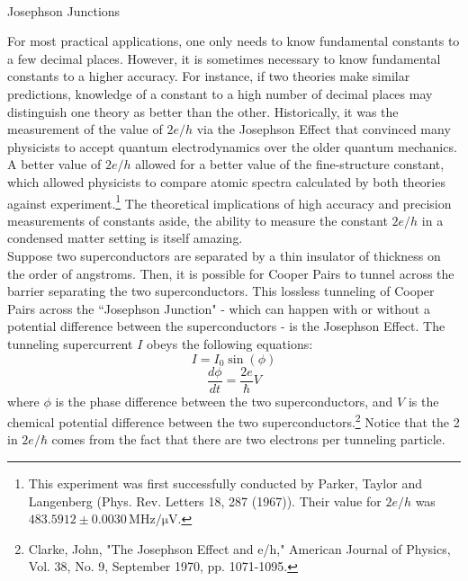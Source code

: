 \documentclass[a4paper,12pt]{article}
\newcommand{\unit}[1]{\ensuremath{\, \mathrm{#1}}}
\begin{document}
\begin{center}
\mbox{} \\
{ \huge Josephson Junctions }
\end{center}

\onehalfspace

\hspace*{5 mm} For most practical applications, one only needs to know fundamental constants to a few decimal places.  However, it is sometimes necessary to know fundamental constants to a higher accuracy.  For instance, if two theories make similar predictions, knowledge of a constant to a high number of decimal places may distinguish one theory as better than the other.  Historically, it was the measurement of the value of $2e/h$ via the Josephson Effect that convinced many physicists to accept quantum electrodynamics over the older quantum mechanics.  A better value of $2e/h$ allowed for a better value of the fine-structure constant, which allowed physicists to compare atomic spectra calculated by both theories against experiment.\footnote{This experiment was first successfully conducted by Parker, Taylor and Langenberg (Phys. Rev. Letters 18, 287 (1967)).  Their value for $2e/h$ was $483.5912 \pm 0.0030 \unit{MHz/\mu V}$.}  The theoretical implications of high accuracy and precision measurements of constants aside, the ability to measure the constant $2e/h$ in a condensed matter setting is itself amazing.  \\
\hspace*{5 mm} Suppose two superconductors are separated by a thin insulator of thickness on the order of angstroms.  Then, it is possible for Cooper Pairs to tunnel across the barrier separating the two superconductors.  This lossless tunneling of Cooper Pairs across the ``Josephson Junction" - which can happen with or without a potential difference between the superconductors - is the Josephson Effect.  The tunneling supercurrent $I$ obeys the following equations:
\begin{equation}\label{Josephson Relation 1}
I=I_0 \sin(\phi)
\end{equation}
\begin{equation}\label{Josephson Relation 2}
\frac{d\phi}{dt}=\frac{2e}{\hbar}V
\end{equation}
where $\phi$ is the phase difference between the two superconductors, and $V$ is the chemical potential difference between the two superconductors.\footnote{Clarke, John, "The Josephson Effect and e/h," American Journal of Physics, Vol. 38, No. 9, September 1970, pp. 1071-1095.}  Notice that the 2 in $2e/\hbar$ comes from the fact that there are two electrons per tunneling particle. \\
\end{document}
